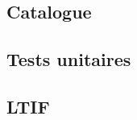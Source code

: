\documentclass[11pt, a4paper]{article}
\begin{document}
\subsection{Catalogue}


\newpage
\subsection{Tests unitaires}

\subsection{LTIF}

\end{document}

